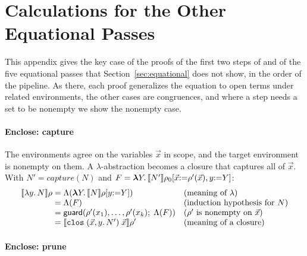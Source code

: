\section{Calculations for the Other Equational Passes}
\label{app:calculations}

This appendix gives the key case of the proofs of the first two steps of  and of the five equational passes that Section~\ref{sec:equational} does not show, in the order of the pipeline. As there, each proof generalizes the equation to open terms under related environments, the other cases are congruences, and where a step needs a set to be nonempty we show the nonempty case.

\paragraph{Enclose: capture}

The environments agree on the variables $\vec{x}$ in scope, and the
target environment is nonempty on them. A $\lambda$-abstraction becomes
a closure that captures all of $\vec{x}$. With $N' =
\mathit{capture}(N)$ and $F = \boldsymbol{\lambda} Y.\, \llbracket N' \rrbracket\rho_0[\vec{x}{:=}\rho'(\vec{x}),
y{:=}Y]$:
{\small
\[
\begin{array}{@{}r@{\;}c@{\;}l@{\quad}l@{}}
  \den{\lambda y.\,N}\rho & = & \Lambda(\mlam{Y} \den{N}\rho[y{:=}Y]) & \text{(meaning of $\lambda$)}\\
    & = & \Lambda(F) & \text{(induction hypothesis for $N$)}\\
    & = & \mathsf{guard}(\rho'(x_1), \ldots, \rho'(x_k);\; \Lambda(F)) & \text{($\rho'$ is nonempty on $\vec{x}$)}\\
    & = & \den{\kw{clos}\;(\vec{x}, y.\,N')\;\vec{x}}\rho' & \text{(meaning of a closure)}
\end{array}
\]}

\paragraph{Enclose: prune}


